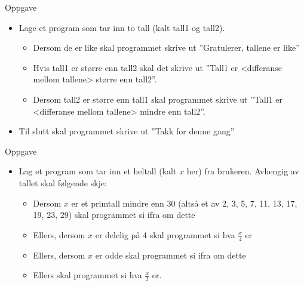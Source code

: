 \documentclass[screen, aspectratio=169]{beamer}
\begin{document}
\begin{frame}{Oppgave}
	\begin{itemize}
		\item Lage et program som tar inn to tall (kalt tall1 og tall2). 
		\begin{itemize}
			\item Dersom de er like skal programmet skrive ut ''Gratulerer, tallene er like''
			\item Hvis tall1 er større enn tall2 skal det skrive ut ''Tall1 er <differanse mellom tallene> større enn tall2''.
			\item Dersom tall2 er større enn tall1 skal programmet skrive ut ''Tall1 er <differanse mellom tallene> mindre enn tall2''.
		\end{itemize}
		\item Til slutt skal programmet skrive ut ''Takk for denne gang''
	\end{itemize}
\end{frame}

\begin{frame}{Oppgave}
	\begin{itemize}
		\item Lag et program som tar inn et heltall (kalt $x$ her) fra brukeren. Avhengig av tallet skal følgende skje:
		\begin{itemize}
			\item Dersom $x$ er et primtall mindre enn 30 (altså et av 2, 3, 5, 7, 11, 13, 17, 19, 23, 29) skal programmet si ifra om dette
			\item Ellers, dersom $x$ er delelig på 4 skal programmet si hva $\frac{x}{4}$ er
			\item Ellers, dersom $x$ er odde skal programmet si ifra om dette
			\item Ellers skal programmet si hva $\frac{x}{2}$ er.
		\end{itemize}
	\end{itemize}
\end{frame}
\end{document}
